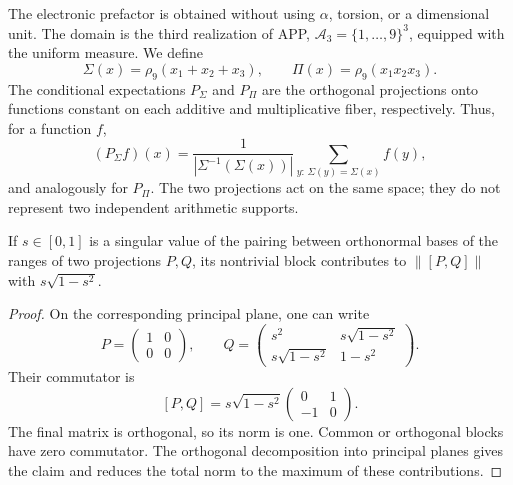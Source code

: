 The electronic prefactor is obtained without using \(\alpha\), torsion,
or a dimensional unit. The domain is the third realization of APP,
\(\mathcal A_3=\{1,\ldots,9\}^3\), equipped with the uniform measure.
We define
\[
 \Sigma(x)=\rho_9(x_1+x_2+x_3),\qquad
 \Pi(x)=\rho_9(x_1x_2x_3).
\]
The conditional expectations \(P_\Sigma\) and \(P_\Pi\) are the
orthogonal projections onto functions constant on each additive
and multiplicative fiber, respectively. Thus, for a function \(f\),
\[
 (P_\Sigma f)(x)
 =\frac{1}{|\Sigma^{-1}(\Sigma(x))|}
   \sum_{y:\,\Sigma(y)=\Sigma(x)}f(y),
\]
and analogously for \(P_\Pi\). The two projections act on the
same space; they do not represent two independent arithmetic supports.

\begin{lemma}
If \(s\in[0,1]\) is a singular value of the pairing between orthonormal
bases of the ranges of two projections \(P,Q\), its nontrivial
block contributes to \(\|[P,Q]\|\) with
\(s\sqrt{1-s^2}\).
\end{lemma}
\begin{proof}
On the corresponding principal plane, one can write
\[
 P=\begin{pmatrix}1&0\\0&0\end{pmatrix},\qquad
 Q=\begin{pmatrix}
 s^2&s\sqrt{1-s^2}\\
 s\sqrt{1-s^2}&1-s^2
 \end{pmatrix}.
\]
Their commutator is
\[
 [P,Q]=s\sqrt{1-s^2}
 \begin{pmatrix}0&1\\-1&0\end{pmatrix}.
\]
The final matrix is orthogonal, so its norm is one. Common
or orthogonal blocks have zero commutator. The orthogonal decomposition
into principal planes gives the claim and reduces the total norm to the maximum
of these contributions.
\end{proof}

